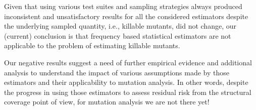 \documentclass[sigconf,review,anonymous]{acmart}
\begin{document}
Given that using various test suites and sampling strategies always produced inconsistent and
unsatisfactory results for all the considered estimators despite the underlying
sampled quantity, i.e., killable
mutants, did not change, 
our (current) conclusion is that frequency based statistical %
estimators are not applicable to the problem of estimating killable mutants.

Our negative results
suggest a need of further empirical evidence and additional analysis
to understand the impact of various assumptions made by those %
estimators and their applicability to mutation analysis.
%
In other words, despite the progress in using those estimators to assess residual risk 
from the structural coverage point of view, for mutation analysis we are not there yet!






%




%
\end{document}
